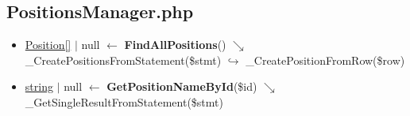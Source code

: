 \subsection{PositionsManager.php}
\begin{itemize}
  \setlength\itemsep{0em}
  \item \underline{Position[]} $\vert$ null $\leftarrow$  \textbf{FindAllPositions}()
  \newline    $\searrow$ \_CreatePositionsFromStatement(\$stmt)
  \newline    $\hookrightarrow$ \_CreatePositionFromRow(\$row)
  \item \underline{string} $\vert$ null $\leftarrow$ \textbf{GetPositionNameById}(\$id)
  \newline    $\searrow$ \_GetSingleResultFromStatement(\$stmt)
\end{itemize}
\newpage
